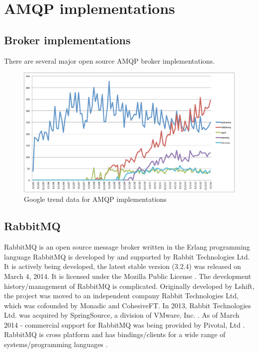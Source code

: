 \documentclass{thesis}
\begin{document}
\section{AMQP implementations}

\subsection{Broker implementations}

There are several major open source AMQP broker implementations.  

\begin{figure}
\centering
\vspace{2.0in} 
\includegraphics[scale=.5]{broker_popularity}  
\caption{Google trend data for AMQP implementations}
\label{Figure 1}  
\end{figure}


\subsection{RabbitMQ}
RabbitMQ is an open source message broker written in the Erlang programming language \cite{RABBITMQ} RabbitMQ is developed by and supported by Rabbit Technologies Ltd.  It is actively being developed, the latest stable version (3.2.4) was released on March 4, 2014.  It is licensed under the Mozilla Public License \cite{rabbitmq-wikipedia}.  The development history/management of RabbitMQ is complicated.  Originally developed by Lshift, the project was moved to an independent company Rabbit Technologies Ltd, which was cofounded by Monadic and CohesiveFT.  In 2013, Rabbit Technologies Ltd. was acquired by SpringSource, a division of VMware, Inc. \cite{LSHIFT}.  As of March 2014 - commercial support for RabbitMQ was being provided by Pivotal, Ltd \cite{PIVOTAL}.  RabbitMQ is cross platform and has bindings/clients for a wide range of systems/programming languages \cite{RABBITMQ_CLIENTS}.  
\end{document}
